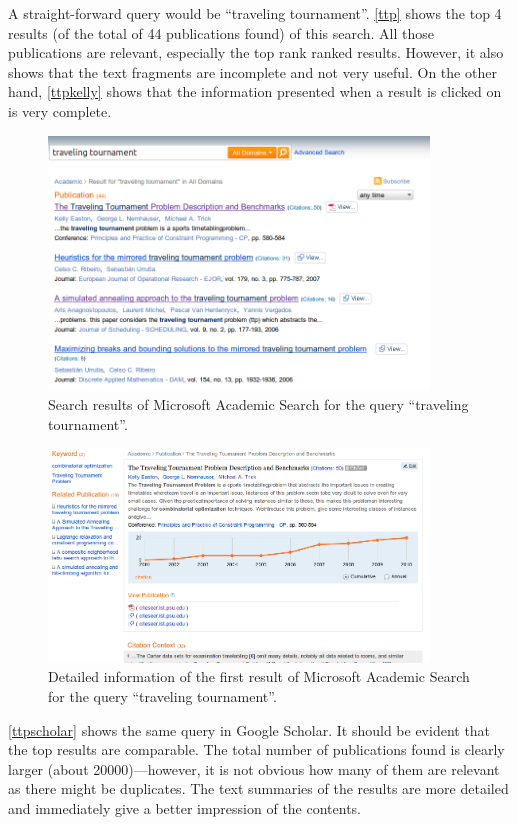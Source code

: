 \documentclass[a4paper,english,10pt]{scrartcl}
\begin{document}
A straight-forward query would be ``traveling tournament''. \autoref{ttp} shows the top 4 results (of the total of 44 publications found) of this search. All those publications are relevant, especially the top rank ranked results. However, it also shows that the text fragments are incomplete and not very useful. On the other hand, \autoref{ttpkelly} shows that the information presented when a result is clicked on is very complete.

\begin{figure}[hbpt]
 \centering
 \includegraphics[width=0.9\textwidth]{ttp}
 \caption{Search results of Microsoft Academic Search for the query ``traveling tournament''.}
 \label{ttp}
\end{figure}

\begin{figure}[hbpt]
 \centering
 \includegraphics[width=0.9\textwidth]{ttpkelly}
 \caption{Detailed information of the first result of Microsoft Academic Search for the query ``traveling tournament''.}
 \label{ttpkelly}
\end{figure}

\autoref{ttpscholar} shows the same query in Google Scholar. It should be evident that the top results are comparable. The total number of publications found is clearly larger (about 20000)---however, it is not obvious how many of them are relevant as there might be duplicates.
The text summaries of the results are more detailed and immediately give a better impression of the contents.
\end{document}

